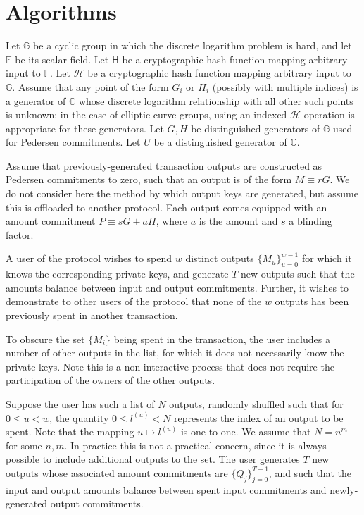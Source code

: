 \documentclass[draft]{article}
\newcommand{\G}{\mathbb{G}}
\newcommand{\F}{\mathbb{F}}
\newcommand{\hs}{\mathsf{H}}
\newcommand{\hp}{\mathcal{H}}
\begin{document}
\section{Algorithms}
Let $\G$ be a cyclic group in which the discrete logarithm problem is hard, and let $\F$ be its scalar field.
Let $\hs$ be a cryptographic hash function mapping arbitrary input to $\F$.
Let $\hp$ be a cryptographic hash function mapping arbitrary input to $\G$.
Assume that any point of the form $G_i$ or $H_i$ (possibly with multiple indices) is a generator of $\G$ whose discrete logarithm relationship with all other such points is unknown; in the case of elliptic curve groups, using an indexed $\hp$ operation is appropriate for these generators.
Let $G, H$ be distinguished generators of $\G$ used for Pedersen commitments.
Let $U$ be a distinguished generator of $\G$.

Assume that previously-generated transaction outputs are constructed as Pedersen commitments to zero, such that an output is of the form $M \equiv rG$.
We do not consider here the method by which output keys are generated, but assume this is offloaded to another protocol.
Each output comes equipped with an amount commitment $P \equiv sG + aH$, where $a$ is the amount and $s$ a blinding factor.

A user of the protocol wishes to spend $w$ distinct outputs $\{M_u\}_{u=0}^{w-1}$ for which it knows the corresponding private keys, and generate $T$ new outputs such that the amounts balance between input and output commitments.
Further, it wishes to demonstrate to other users of the protocol that none of the $w$ outputs has been previously spent in another transaction.

To obscure the set $\{M_i\}$ being spent in the transaction, the user includes a number of other outputs in the list, for which it does not necessarily know the private keys.
Note this is a non-interactive process that does not require the participation of the owners of the other outputs.

Suppose the user has such a list of $N$ outputs, randomly shuffled such that for $0 \leq u < w$, the quantity $0 \leq l^{(u)} < N$ represents the index of an output to be spent.
Note that the mapping $u \mapsto l^{(u)}$ is one-to-one.
We assume that $N = n^m$ for some $n,m$.
In practice this is not a practical concern, since it is always possible to include additional outputs to the set.
The user generates $T$ new outputs whose associated amount commitments are $\{Q_j\}_{j=0}^{T-1}$, and such that the input and output amounts balance between spent input commitments and newly-generated output commitments.
\end{document}
